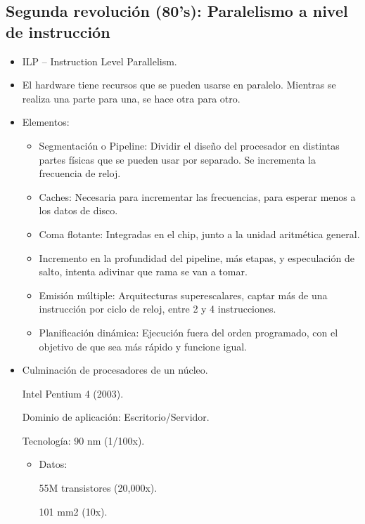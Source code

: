\documentclass[12pt, twoside, openright]{report} %
\begin{document}
    \subsection{Segunda revolución (80's): Paralelismo a nivel de instrucción}

    \begin{itemize}
    \item
      ILP -- Instruction Level Parallelism.
    \item
      El hardware tiene recursos que se pueden usarse en paralelo.
      Mientras se realiza una parte para una, se hace otra para otro.
    \item
      Elementos:

      \begin{itemize}
      
      \item
        Segmentación o Pipeline: Dividir el diseño del procesador en
        distintas partes físicas que se pueden usar por separado. Se
        incrementa la frecuencia de reloj.
      \item
        Caches: Necesaria para incrementar las frecuencias, para esperar
        menos a los datos de disco.
      \item
        Coma flotante: Integradas en el chip, junto a la unidad
        aritmética general.
      \item
        Incremento en la profundidad del pipeline, más etapas, y
        especulación de salto, intenta adivinar que rama se van a tomar.
      \item
        Emisión múltiple: Arquitecturas superescalares, captar más de
        una instrucción por ciclo de reloj, entre 2 y 4 instrucciones.
      \item
        Planificación dinámica: Ejecución fuera del orden programado,
        con el objetivo de que sea más rápido y funcione igual.
      \end{itemize}
    \item
      Culminación de procesadores de un núcleo.

      Intel Pentium 4 (2003).

      Dominio de aplicación: Escritorio/Servidor.

      Tecnología: 90 nm (1/100x).
      \begin{itemize}
        \item Datos:

      55M transistores (20,000x).

      101 mm2 (10x).


\end{itemize}
\end{itemize}
\end{document}
